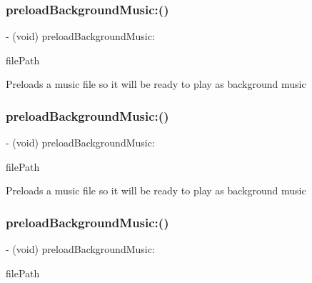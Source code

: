 \subsubsection{\texorpdfstring{preload\+Background\+Music\+:()}{preloadBackgroundMusic:()}\hspace{0.1cm}{\footnotesize\ttfamily [2/4]}}
{\footnotesize\ttfamily -\/ (void) preload\+Background\+Music\+: \begin{DoxyParamCaption}\item[{(N\+S\+String $\ast$)}]{file\+Path }\end{DoxyParamCaption}}

Preloads a music file so it will be ready to play as background music \mbox{\label{interfaceSimpleAudioEngine_a289e2e89ab55d63a38792fd8f2e5b645}} 
\subsubsection{\texorpdfstring{preload\+Background\+Music\+:()}{preloadBackgroundMusic:()}\hspace{0.1cm}{\footnotesize\ttfamily [3/4]}}
{\footnotesize\ttfamily -\/ (void) preload\+Background\+Music\+: \begin{DoxyParamCaption}\item[{(N\+S\+String $\ast$)}]{file\+Path }\end{DoxyParamCaption}}

Preloads a music file so it will be ready to play as background music \mbox{\label{interfaceSimpleAudioEngine_a289e2e89ab55d63a38792fd8f2e5b645}} 
\subsubsection{\texorpdfstring{preload\+Background\+Music\+:()}{preloadBackgroundMusic:()}\hspace{0.1cm}{\footnotesize\ttfamily [4/4]}}
{\footnotesize\ttfamily -\/ (void) preload\+Background\+Music\+: \begin{DoxyParamCaption}\item[{(N\+S\+String$\ast$)}]{file\+Path }\end{DoxyParamCaption}}

